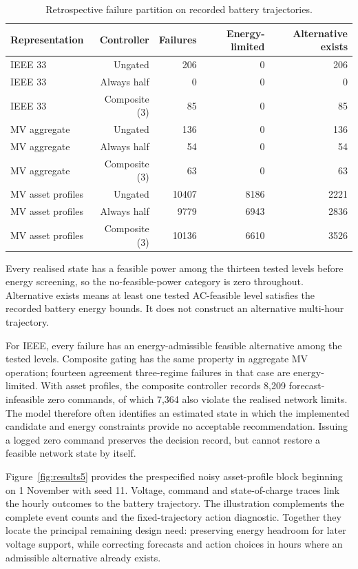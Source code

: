 \documentclass[preprint,12pt]{elsarticle}
\begin{document}
\begin{table}[tbp]
\centering\small\setlength{\tabcolsep}{3.5pt}
\caption{Retrospective failure partition on recorded battery trajectories.}\label{tab:feasibility}
\begin{tabular}{lrrrr}
\toprule
Representation & Controller & Failures & Energy-limited & Alternative exists\\\midrule
IEEE 33 & Ungated & 206 & 0 & 206\\
IEEE 33 & Always half & 0 & 0 & 0\\
IEEE 33 & Composite (3) & 85 & 0 & 85\\
MV aggregate & Ungated & 136 & 0 & 136\\
MV aggregate & Always half & 54 & 0 & 54\\
MV aggregate & Composite (3) & 63 & 0 & 63\\
MV asset profiles & Ungated & 10407 & 8186 & 2221\\
MV asset profiles & Always half & 9779 & 6943 & 2836\\
MV asset profiles & Composite (3) & 10136 & 6610 & 3526\\
\bottomrule\end{tabular}
\par\smallskip\parbox{\linewidth}{\footnotesize Every realised state has a feasible power among the thirteen tested levels before energy screening, so the no-feasible-power category is zero throughout. Alternative exists means at least one tested AC-feasible level satisfies the recorded battery energy bounds. It does not construct an alternative multi-hour trajectory.}
\end{table}
For IEEE, every failure has an energy-admissible feasible alternative among the tested levels. Composite gating has the same property in aggregate MV operation; fourteen agreement three-regime failures in that case are energy-limited. With asset profiles, the composite controller records 8,209 forecast-infeasible zero commands, of which 7,364 also violate the realised network limits. The model therefore often identifies an estimated state in which the implemented candidate and energy constraints provide no acceptable recommendation. Issuing a logged zero command preserves the decision record, but cannot restore a feasible network state by itself.

Figure~\ref{fig:results5} provides the prespecified noisy asset-profile block beginning on 1 November with seed 11. Voltage, command and state-of-charge traces link the hourly outcomes to the battery trajectory. The illustration complements the complete event counts and the fixed-trajectory action diagnostic. Together they locate the principal remaining design need: preserving energy headroom for later voltage support, while correcting forecasts and action choices in hours where an admissible alternative already exists.
\end{document}
